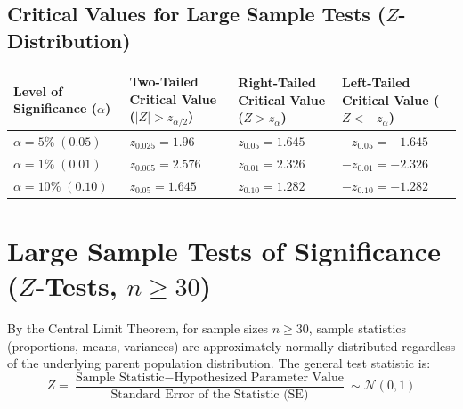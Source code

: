 \documentclass[12pt,a4paper]{article}
\begin{document}
\subsection{Critical Values for Large Sample Tests ($Z$-Distribution)}
\par\vspace{6pt}
\begingroup
\setlength{\tabcolsep}{6pt}
\setlength{\extrarowheight}{3pt}
\noindent\begin{tabularx}{\linewidth}{|B{3.0cm}|B{3.2cm}|B{3.5cm}|Y|}
\hline
\textbf{Level of Significance ($\alpha$)} & \textbf{Two-Tailed Critical Value ($|Z| > z_{\alpha/2}$)} & \textbf{Right-Tailed Critical Value ($Z > z_\alpha$)} & \textbf{Left-Tailed Critical Value ($Z < -z_\alpha$)} \\
\hline
$\alpha = 5\% \; (0.05)$ & $z_{0.025} = 1.96$ & $z_{0.05} = 1.645$ & $-z_{0.05} = -1.645$ \\
\hline
$\alpha = 1\% \; (0.01)$ & $z_{0.005} = 2.576$ & $z_{0.01} = 2.326$ & $-z_{0.01} = -2.326$ \\
\hline
$\alpha = 10\% \; (0.10)$ & $z_{0.05} = 1.645$ & $z_{0.10} = 1.282$ & $-z_{0.10} = -1.282$ \\
\hline
\end{tabularx}\par
\endgroup
\vspace{12pt}

\section{Large Sample Tests of Significance ($Z$-Tests, $n \ge 30$)}

By the Central Limit Theorem, for sample sizes $n \ge 30$, sample statistics (proportions, means, variances) are approximately normally distributed regardless of the underlying parent population distribution. The general test statistic is:
\begin{equation}
  Z = \frac{\text{Sample Statistic} - \text{Hypothesized Parameter Value}}{\text{Standard Error of the Statistic (SE)}} \sim \mathcal{N}(0, 1)
\end{equation}
\end{document}

